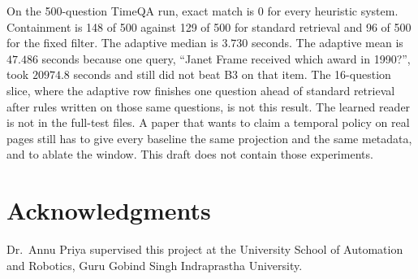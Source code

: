 \documentclass[11pt,letterpaper]{article}
\begin{document}
On the 500-question TimeQA run, exact match is 0 for every heuristic system.
Containment is 148 of 500 against 129 of 500 for standard retrieval and 96 of 500 for the fixed filter.
The adaptive median is $3.730$ seconds.
The adaptive mean is $47.486$ seconds because one query, ``Janet Frame received which award in 1990?'', took $20974.8$ seconds and still did not beat B3 on that item.
The 16-question slice, where the adaptive row finishes one question ahead of standard retrieval after rules written on those same questions, is not this result.
The learned reader is not in the full-test files.
A paper that wants to claim a temporal policy on real pages still has to give every baseline the same projection and the same metadata, and to ablate the window.
This draft does not contain those experiments.

\section*{Acknowledgments}
Dr.\ Annu Priya supervised this project at the University School of Automation and Robotics, Guru Gobind Singh Indraprastha University.
\end{document}
